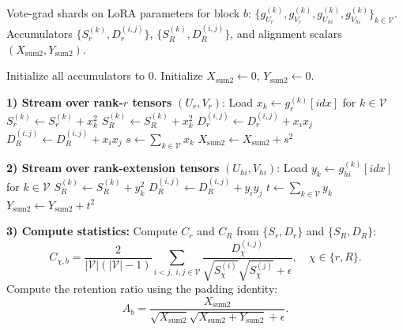 \documentclass{article}
\begin{document}
\begin{algorithm}[H]
\caption{Streaming Accumulation Kernel (Per-Block, Unified Voter Set $\mathcal{V}$)}
\begin{algorithmic}[1]
\Require Vote-grad shards on LoRA parameters for block $b$:
$\{g_{U_r}^{(k)}, g_{V_r}^{(k)}, g_{U_{hi}}^{(k)}, g_{V_{hi}}^{(k)}\}_{k\in\mathcal{V}}$.
\Ensure Accumulators $\{S_r^{(k)},D_r^{(i,j)}\}$, $\{S_R^{(k)},D_R^{(i,j)}\}$, and alignment scalars $(X_{\mathrm{sum2}}, Y_{\mathrm{sum2}})$.

\State Initialize all accumulators to $0$.
\State Initialize $X_{\mathrm{sum2}}\gets 0$, $Y_{\mathrm{sum2}}\gets 0$.

\Statex
\State \textbf{1) Stream over rank-$r$ tensors} $(U_r,V_r)$:
    \State Load $x_k \gets g_r^{(k)}[idx]$ for $k\in\mathcal{V}$
        \State $S_r^{(k)} \gets S_r^{(k)} + x_k^2$
        \State $S_R^{(k)} \gets S_R^{(k)} + x_k^2$ 
    \EndFor
        \State $D_r^{(i,j)} \gets D_r^{(i,j)} + x_i x_j$
        \State $D_R^{(i,j)} \gets D_R^{(i,j)} + x_i x_j$
    \EndFor
    \State $s \gets \sum_{k\in\mathcal V} x_k$
    \State $X_{\mathrm{sum2}} \gets X_{\mathrm{sum2}} + s^2$
\EndFor

\Statex
\State \textbf{2) Stream over rank-extension tensors} $(U_{hi},V_{hi})$:
    \State Load $y_k \gets g_{hi}^{(k)}[idx]$ for $k\in\mathcal{V}$
        \State $S_R^{(k)} \gets S_R^{(k)} + y_k^2$ 
    \EndFor
        \State $D_R^{(i,j)} \gets D_R^{(i,j)} + y_i y_j$
    \EndFor
    \State $t \gets \sum_{k\in\mathcal V} y_k$
    \State $Y_{\mathrm{sum2}} \gets Y_{\mathrm{sum2}} + t^2$
\EndFor

\Statex
\State \textbf{3) Compute statistics:}
\State Compute $C_r$ and $C_R$ from $\{S_r,D_r\}$ and $\{S_R,D_R\}$:
\[
C_{\chi,b}=
\frac{2}{|\mathcal V|(|\mathcal V|-1)}
\sum_{i<j,\; i,j\in\mathcal V}
\frac{D_{\chi}^{(i,j)}}{\sqrt{S_{\chi}^{(i)}}\sqrt{S_{\chi}^{(j)}}+\epsilon},
\quad \chi\in\{r,R\}.
\]
\State Compute the retention ratio using the padding identity:
\[
A_b=
\frac{X_{\mathrm{sum2}}}
{\sqrt{X_{\mathrm{sum2}}}\sqrt{X_{\mathrm{sum2}}+Y_{\mathrm{sum2}}}+\epsilon}.
\]
\end{algorithmic}
\end{algorithm}
\end{document}
